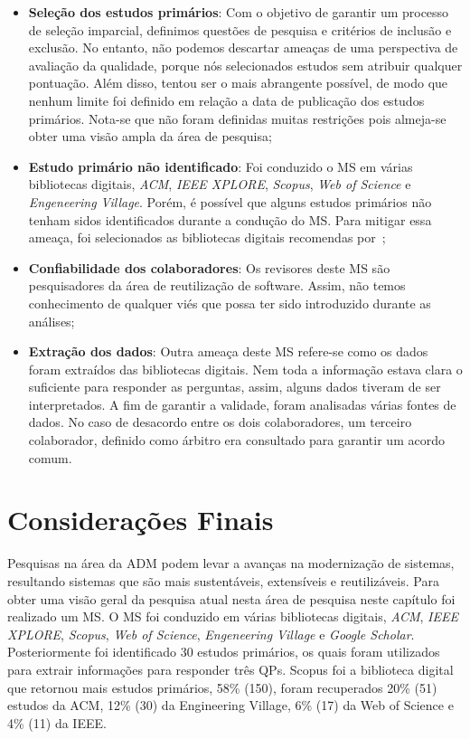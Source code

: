 \begin{itemize}
\item \textbf{Seleção dos estudos primários}: Com o objetivo de garantir um processo de seleção imparcial, definimos questões de pesquisa e critérios de inclusão e exclusão.
No entanto, não podemos descartar ameaças de uma perspectiva de avaliação da qualidade, porque nós selecionados estudos sem atribuir qualquer pontuação. Além disso, tentou ser o mais abrangente possível, de modo que nenhum limite foi definido em relação a data de publicação dos estudos primários. Nota-se que não foram definidas muitas restrições pois almeja-se obter uma visão ampla da área de pesquisa;

\item \textbf{Estudo primário não identificado}: Foi conduzido o MS em várias bibliotecas digitais, \textit{ACM}, \textit{IEEE XPLORE}, \textit{Scopus}, \textit{Web of Science} e \textit{Engeneering Village}. Porém, é possível que alguns estudos primários não tenham sidos identificados durante a condução do MS. Para mitigar essa ameaça, foi selecionados as bibliotecas digitais recomendas por~;

\item \textbf{Confiabilidade dos colaboradores}: Os revisores deste MS são pesquisadores da área de reutilização de software. Assim, não temos conhecimento de qualquer viés que possa ter sido introduzido durante as análises;

\item \textbf{Extração dos dados}: Outra ameaça deste MS refere-se como os dados foram extraídos das bibliotecas digitais. Nem toda a informação estava clara o suficiente para responder as perguntas, assim, alguns dados tiveram de ser interpretados.
A fim de garantir a validade, foram analisadas várias fontes de dados. No caso de desacordo entre os dois colaboradores, um terceiro colaborador, definido como árbitro era consultado para garantir um acordo comum.

\end{itemize}


\section{Considerações Finais}

Pesquisas na área da ADM podem levar a avanças na modernização de sistemas, resultando sistemas que são mais sustentáveis, extensíveis e reutilizáveis. Para obter uma visão geral da pesquisa atual nesta área de pesquisa neste capítulo foi realizado um MS. O MS foi conduzido em várias bibliotecas digitais, \textit{ACM}, \textit{IEEE XPLORE}, \textit{Scopus}, \textit{Web of Science}, \textit{Engeneering Village} e \textit{Google Scholar}. Posteriormente foi identificado 30 estudos primários, os quais foram utilizados para extrair informações para responder três QPs. Scopus foi a biblioteca digital que retornou mais estudos primários, 58\% (150), foram recuperados 20\% (51) estudos da ACM, 12\% (30) da Engineering Village, 6\% (17) da Web of Science e 4\% (11) da IEEE. 

